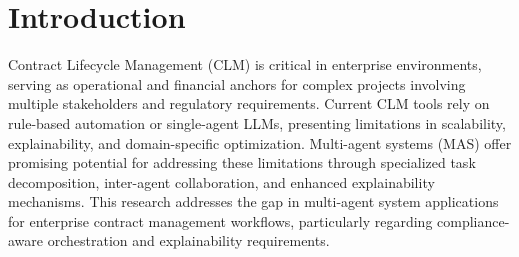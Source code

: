 
\section{Introduction}\label{section:introduction}

Contract Lifecycle Management (CLM) is critical in enterprise environments, serving as operational and financial anchors for complex projects involving multiple stakeholders and regulatory requirements. Current CLM tools rely on rule-based automation or single-agent LLMs, presenting limitations in scalability, explainability, and domain-specific optimization.
\newline
\break
Multi-agent systems (MAS) offer promising potential for addressing these limitations through specialized task decomposition, inter-agent collaboration, and enhanced explainability mechanisms. This research addresses the gap in multi-agent system applications for enterprise contract management workflows, particularly regarding compliance-aware orchestration and explainability requirements.
